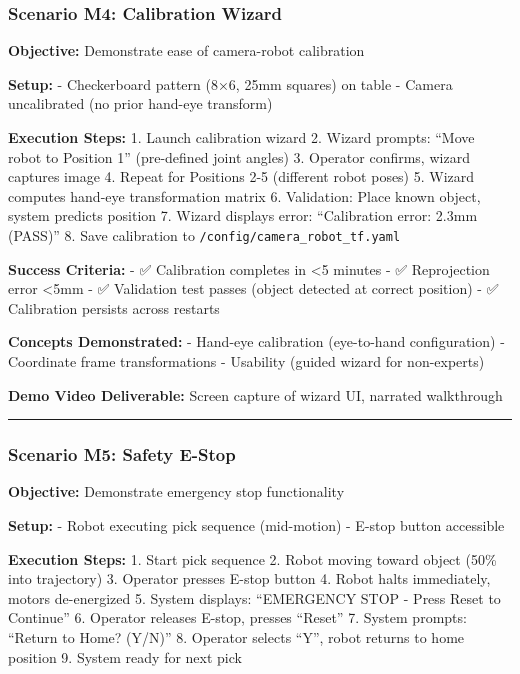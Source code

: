 \documentclass[
]{article}
\begin{document}
\hypertarget{scenario-m4-calibration-wizard}{%
\subsubsection{Scenario M4: Calibration
Wizard}\label{scenario-m4-calibration-wizard}}

\textbf{Objective:} Demonstrate ease of camera-robot calibration

\textbf{Setup:} - Checkerboard pattern (8×6, 25mm squares) on table -
Camera uncalibrated (no prior hand-eye transform)

\textbf{Execution Steps:} 1. Launch calibration wizard 2. Wizard
prompts: ``Move robot to Position 1'' (pre-defined joint angles) 3.
Operator confirms, wizard captures image 4. Repeat for Positions 2-5
(different robot poses) 5. Wizard computes hand-eye transformation
matrix 6. Validation: Place known object, system predicts position 7.
Wizard displays error: ``Calibration error: 2.3mm (PASS)'' 8. Save
calibration to \texttt{/config/camera\_robot\_tf.yaml}

\textbf{Success Criteria:} - ✅ Calibration completes in \textless5
minutes - ✅ Reprojection error \textless5mm - ✅ Validation test passes
(object detected at correct position) - ✅ Calibration persists across
restarts

\textbf{Concepts Demonstrated:} - Hand-eye calibration (eye-to-hand
configuration) - Coordinate frame transformations - Usability (guided
wizard for non-experts)

\textbf{Demo Video Deliverable:} Screen capture of wizard UI, narrated
walkthrough

\begin{center}\rule{0.5\linewidth}{0.5pt}\end{center}

\hypertarget{scenario-m5-safety-e-stop}{%
\subsubsection{Scenario M5: Safety
E-Stop}\label{scenario-m5-safety-e-stop}}

\textbf{Objective:} Demonstrate emergency stop functionality

\textbf{Setup:} - Robot executing pick sequence (mid-motion) - E-stop
button accessible

\textbf{Execution Steps:} 1. Start pick sequence 2. Robot moving toward
object (50\% into trajectory) 3. Operator presses E-stop button 4. Robot
halts immediately, motors de-energized 5. System displays: ``EMERGENCY
STOP - Press Reset to Continue'' 6. Operator releases E-stop, presses
``Reset'' 7. System prompts: ``Return to Home? (Y/N)'' 8. Operator
selects ``Y'', robot returns to home position 9. System ready for next
pick
\end{document}
